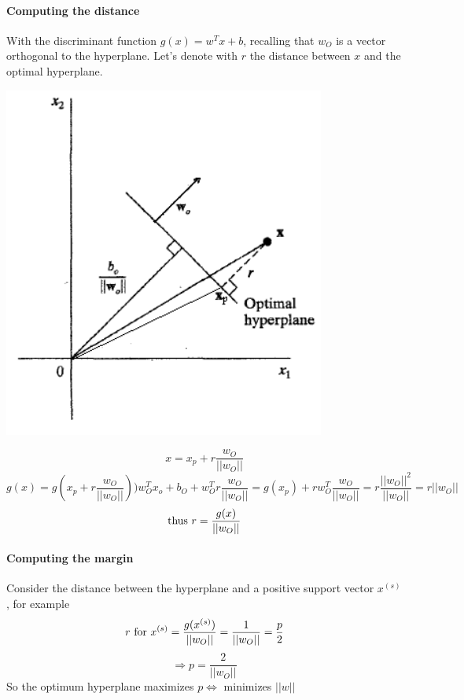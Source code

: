 \documentclass[10pt]{report}
\begin{document}
\paragraph{Computing the distance} With the discriminant function $g(x) = w^Tx + b$, recalling that $w_O$ is a vector orthogonal to the hyperplane. Let's denote with $r$ the distance between $x$ and the optimal hyperplane.
\begin{center}
	\includegraphics[scale=0.5]{20.png}
\end{center}
$$x=x_p+r\frac{w_O}{||w_O||}$$
$$g(x) = g\left(x_p + r\frac{w_O}{||w_O||}\right) ) w_O^Tx_o + b_O + w_O^Tr\frac{w_O}{||w_O||} = g(x_p) + rw_O^T\frac{w_O}{||w_O||} = r\frac{||w_O||^2}{||w_O||} = r||w_O||$$
$$\hbox{thus }r=\frac{g(x)}{||w_O||}$$
\paragraph{Computing the margin} Consider the distance between the hyperplane and a positive support vector $x^{(s)}$, for example $$r\hbox{ for }x^{(s)} = \frac{g(x^{(s)})}{||w_O||} = \frac{1}{||w_O||} = \frac{p}{2}$$
$$\Rightarrow p = \frac{2}{||w_O||}$$
So the optimum hyperplane maximizes $p\Leftrightarrow$ minimizes $||w||$
\end{document}
